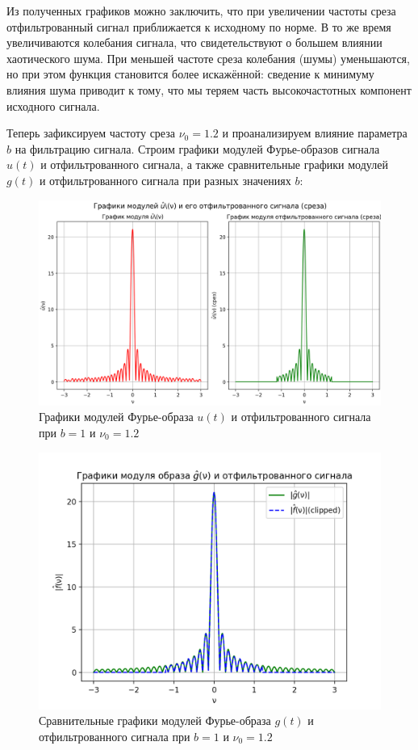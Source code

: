 Из полученных графиков можно заключить, что при увеличении частоты среза отфильтрованный сигнал приближается к исходному по норме. В то же время увеличиваются колебания сигнала, что свидетельствуют о большем влиянии хаотического шума. При меньшей частоте среза колебания (шумы) уменьшаются, но при этом функция становится более искажённой: сведение к минимуму влияния шума приводит к тому, что мы теряем часть высокочастотных компонент исходного сигнала.

Теперь зафиксируем частоту среза $\nu_0=1.2$ и проанализируем влияние параметра $b$ на фильтрацию сигнала. Строим графики модулей Фурье-образов сигнала $u(t)$ и отфильтрованного сигнала, а также сравнительные графики модулей $g(t)$ и отфильтрованного сигнала при разных значениях $b$:



\begin{figure}[ht!]
    \centering
    \includegraphics[scale=0.55]{media/1 task/high_freq/Fourier_Image_1_-1,1981981981981982.png}
    \caption{Графики модулей Фурье-образа $u (t)$ и отфильтрованного сигнала при $b=1$ и $\nu_0=1.2$}
    \label{fig:four_1_12}
\end{figure}

\begin{figure}[ht!]
    \centering
    \includegraphics[scale=0.55]{media/1 task/high_freq/Fourier_Image_Comparison_1_-1,1981981981981982.png}
    \caption{Сравнительные графики модулей Фурье-образа $g(t)$ и отфильтрованного сигнала при $b=1$ и $\nu_0=1.2$}
    \label{fig:fourc_1_12}
\end{figure}

